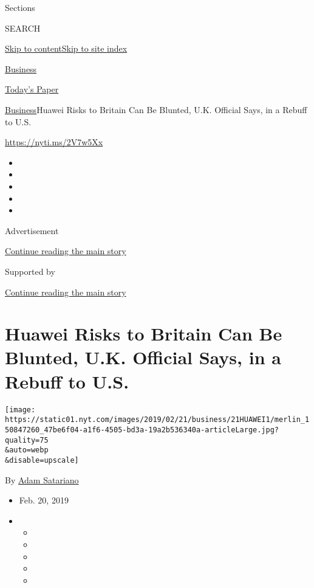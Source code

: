 Sections

SEARCH

\protect\hyperlink{site-content}{Skip to
content}\protect\hyperlink{site-index}{Skip to site index}

\href{https://www.nytimes.com/section/business}{Business}

\href{https://myaccount.nytimes.com/auth/login?response_type=cookie\&client_id=vi}{}

\href{https://www.nytimes.com/section/todayspaper}{Today's Paper}

\href{/section/business}{Business}\textbar{}Huawei Risks to Britain Can
Be Blunted, U.K. Official Says, in a Rebuff to U.S.

\url{https://nyti.ms/2V7w5Xx}

\begin{itemize}
\item
\item
\item
\item
\item
\end{itemize}

Advertisement

\protect\hyperlink{after-top}{Continue reading the main story}

Supported by

\protect\hyperlink{after-sponsor}{Continue reading the main story}

\hypertarget{huawei-risks-to-britain-can-be-blunted-uk-official-says-in-a-rebuff-to-us}{%
\section{Huawei Risks to Britain Can Be Blunted, U.K. Official Says, in
a Rebuff to
U.S.}\label{huawei-risks-to-britain-can-be-blunted-uk-official-says-in-a-rebuff-to-us}}

\texttt{[image: https://static01.nyt.com/images/2019/02/21/business/21HUAWEI1/merlin\_150847260\_47be6f04-a1f6-4505-bd3a-19a2b536340a-articleLarge.jpg?quality=75\\\&auto=webp\\\&disable=upscale]}

By \href{https://www.nytimes.com/by/adam-satariano}{Adam Satariano}

\begin{itemize}
\item
  Feb. 20, 2019
\item
  \begin{itemize}
  \item
  \item
  \item
  \item
  \item
  \end{itemize}
\end{itemize}

